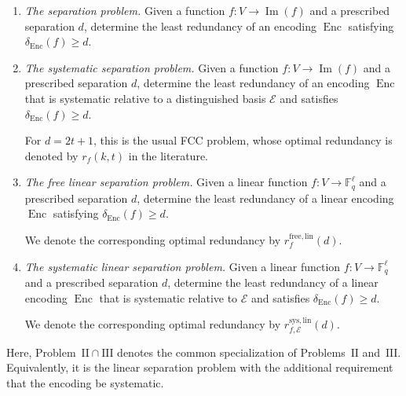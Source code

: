 \documentclass[a4paper,12pt]{article}
\theoremstyle{plain}
\theoremstyle{definition}
\newcommand{\F}{\mathbb F}
\newcommand{\Enc}{\operatorname{Enc}}
\newcommand{\Imf}{\operatorname{Im}}
\begin{document}
\begin{enumerate}

\item[$\mathrm{I}$]
\emph{The separation problem.}
Given a function $f\colon V\to\Imf(f)$ and a prescribed separation
$d$, determine the least redundancy of an encoding $\Enc$ satisfying
$ \delta_{\Enc}(f)\geq d. $ 

\item[$\mathrm{II}$]
\emph{The systematic separation problem.}
Given a function $f\colon V\to\Imf(f)$ and a prescribed separation
$d$, determine the least redundancy of an encoding $\Enc$ that is
systematic relative to a distinguished basis $\mathcal E$ and satisfies  $\delta_{\Enc}(f)\geq d.$

For $d=2t+1$, this is the usual FCC problem, whose optimal redundancy is denoted by $r_f(k,t)$ in the literature.

\item[$\mathrm{III}$]
\emph{The free linear separation problem.}
Given a   linear function
$f\colon V\to\F_q^\ell$ and a prescribed separation $d$, determine
the least redundancy of a linear encoding $\Enc$ satisfying $
\delta_{\Enc}(f)\geq d. $

We denote the corresponding optimal
redundancy by $r_f^{\mathrm{free,lin}}(d)$.

\item[$\mathrm{II}\cap\mathrm{III}$]
\emph{The systematic linear separation problem.}
Given a   linear function
$f\colon V\to\F_q^\ell$ and a prescribed separation $d$, determine
the least redundancy of a linear encoding $\Enc$ that is systematic
relative to $\mathcal E$ and satisfies
$ \delta_{\Enc}(f)\geq d. $

We denote the corresponding optimal
redundancy by $r_{f,\mathcal E}^{\mathrm{sys,lin}}(d)$.

\end{enumerate}
Here, Problem~$\mathrm{II}\cap\mathrm{III}$ denotes the common
specialization of Problems~$\mathrm{II}$ and~$\mathrm{III}$.
Equivalently, it is the linear separation problem with the
additional requirement that the encoding be systematic.
\end{document}
